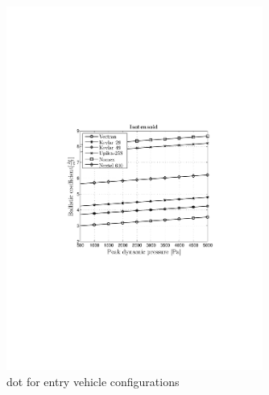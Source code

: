 \begin{figure}[H]
\includegraphics[width = 0.75\textwidth]{Figure/ISO_mat.pdf}
\caption{\acrlong{dot} for entry vehicle configurations}
\label{fig:dotshape}
\end{figure}
